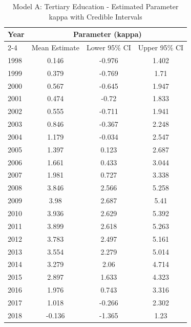 \begin{landscape}
\begin{table}[htbp]
\centering
\caption{Model A: Tertiary Education - Estimated Parameter kappa  with Credible Intervals}
\label{tab:Fparameters_k4}
\begin{tabular}{@{}lccc@{}}
\toprule
Year & \multicolumn{3}{c}{Parameter (kappa)} \\
\cmidrule(lr){2-4}
      & Mean Estimate & Lower 95\% CI & Upper 95\% CI \\
\midrule
1998 & 0.146 & -0.976 & 1.402 \\
1999 & 0.379 & -0.769 & 1.71 \\
2000 & 0.567 & -0.645 & 1.947 \\
2001 & 0.474 & -0.72 & 1.833 \\
2002 & 0.555 & -0.711 & 1.941 \\
2003 & 0.846 & -0.367 & 2.248 \\
2004 & 1.179 & -0.034 & 2.547 \\
2005 & 1.397 & 0.123 & 2.687 \\
2006 & 1.661 & 0.433 & 3.044 \\
2007 & 1.981 & 0.727 & 3.338 \\
2008 & 3.846 & 2.566 & 5.258 \\
2009 & 3.98 & 2.687 & 5.41 \\
2010 & 3.936 & 2.629 & 5.392 \\
2011 & 3.899 & 2.618 & 5.263 \\
2012 & 3.783 & 2.497 & 5.161 \\
2013 & 3.554 & 2.279 & 5.014 \\
2014 & 3.279 & 2.06 & 4.714 \\
2015 & 2.897 & 1.633 & 4.323 \\
2016 & 1.976 & 0.743 & 3.316 \\
2017 & 1.018 & -0.266 & 2.302 \\
2018 & -0.136 & -1.365 & 1.23 \\
\bottomrule
\end{tabular}
\end{table}
\end{landscape}